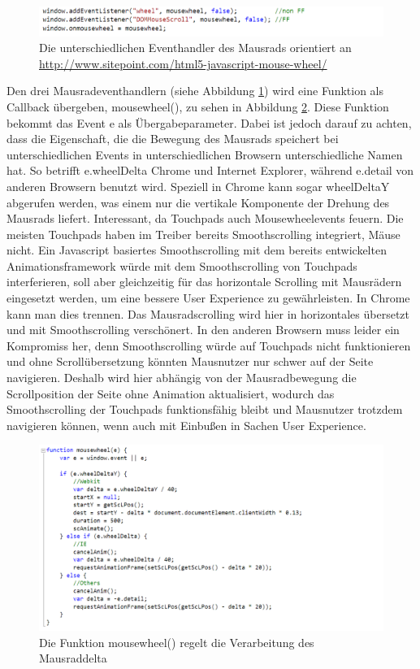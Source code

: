 \begin{figure} [h]
\includegraphics[width=\textwidth]{./img/js_mousehandler.png}
\caption{Die unterschiedlichen Eventhandler des Mausrads orientiert an \url{http://www.sitepoint.com/html5-javascript-mouse-wheel/}}
\label{js_mousehandler}
\end{figure}

Den drei Mausradeventhandlern (siehe Abbildung \ref{js_mousehandler}) wird eine Funktion als Callback übergeben, mousewheel(), zu sehen in Abbildung \ref{js_mousewheel}. Diese Funktion bekommt das Event e als Übergabeparameter. Dabei ist jedoch darauf zu achten, dass die Eigenschaft, die die Bewegung des Mausrads speichert bei unterschiedlichen Events in unterschiedlichen Browsern unterschiedliche Namen hat. So betrifft e.wheelDelta Chrome und Internet Explorer, während e.detail von anderen Browsern benutzt wird. Speziell in Chrome kann sogar wheelDeltaY abgerufen werden, was einem nur die vertikale Komponente der Drehung des Mausrads liefert. Interessant, da Touchpads auch Mousewheelevents feuern. Die meisten Touchpads haben im Treiber bereits Smoothscrolling integriert, Mäuse nicht. Ein Javascript basiertes Smoothscrolling mit dem bereits entwickelten Animationsframework würde mit dem Smoothscrolling von Touchpads interferieren, soll aber gleichzeitig für das horizontale Scrolling mit Mausrädern eingesetzt werden, um eine bessere User Experience zu gewährleisten. In Chrome kann man dies trennen. Das Mausradscrolling wird hier in horizontales übersetzt und mit Smoothscrolling verschönert. In den anderen Browsern muss leider ein Kompromiss her, denn Smoothscrolling würde auf Touchpads nicht funktionieren und ohne Scrollübersetzung könnten Mausnutzer nur schwer auf der Seite navigieren. Deshalb wird hier abhängig von der Mausradbewegung die Scrollposition der Seite ohne Animation aktualisiert, wodurch das Smoothscrolling der Touchpads funktionsfähig bleibt und Mausnutzer trotzdem navigieren können, wenn auch mit Einbußen in Sachen User Experience.

\begin{figure} [h]
\includegraphics[width=\textwidth]{./img/js_mousewheel.png}
\caption{Die Funktion mousewheel() regelt die Verarbeitung des Mausraddelta}
\label{js_mousewheel}
\end{figure}

